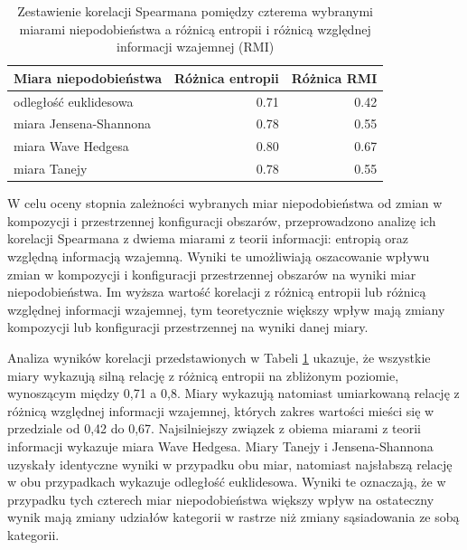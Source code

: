\documentclass{amuthesis}
\begin{document}
\hypertarget{tbl-cztery_miary_ent_relmutinf}{}
\begin{table}
\caption{\label{tbl-cztery_miary_ent_relmutinf}Zestawienie korelacji Spearmana pomiędzy czterema wybranymi miarami
niepodobieństwa a różnicą entropii i różnicą względnej informacji
wzajemnej (RMI) }\tabularnewline

\centering
\begin{tabular}{lrr}
\toprule
Miara niepodobieństwa & Różnica entropii & Różnica RMI\\
\midrule
odległość euklidesowa & 0.71 & 0.42\\
miara Jensena-Shannona & 0.78 & 0.55\\
miara Wave Hedgesa & 0.80 & 0.67\\
miara Tanejy & 0.78 & 0.55\\
\bottomrule
\end{tabular}
\end{table}

W celu oceny stopnia zależności wybranych miar niepodobieństwa od zmian
w kompozycji i przestrzennej konfiguracji obszarów, przeprowadzono
analizę ich korelacji Spearmana z dwiema miarami z teorii informacji:
entropią oraz względną informacją wzajemną. Wyniki te umożliwiają
oszacowanie wpływu zmian w kompozycji i konfiguracji przestrzennej
obszarów na wyniki miar niepodobieństwa. Im wyższa wartość korelacji z
różnicą entropii lub różnicą względnej informacji wzajemnej, tym
teoretycznie większy wpływ mają zmiany kompozycji lub konfiguracji
przestrzennej na wyniki danej miary.

Analiza wyników korelacji przedstawionych w Tabeli
\ref{tbl-cztery_miary_ent_relmutinf} ukazuje, że wszystkie miary
wykazują silną relację z różnicą entropii na zbliżonym poziomie,
wynoszącym między 0,71 a 0,8. Miary wykazują natomiast umiarkowaną
relację z różnicą względnej informacji wzajemnej, których zakres
wartości mieści się w przedziale od 0,42 do 0,67. Najsilniejszy związek
z obiema miarami z teorii informacji wykazuje miara Wave Hedgesa. Miary
Tanejy i Jensena-Shannona uzyskały identyczne wyniki w przypadku obu
miar, natomiast najsłabszą relację w obu przypadkach wykazuje odległość
euklidesowa. Wyniki te oznaczają, że w przypadku tych czterech miar
niepodobieństwa większy wpływ na ostateczny wynik mają zmiany udziałów
kategorii w rastrze niż zmiany sąsiadowania ze sobą kategorii.
\end{document}
